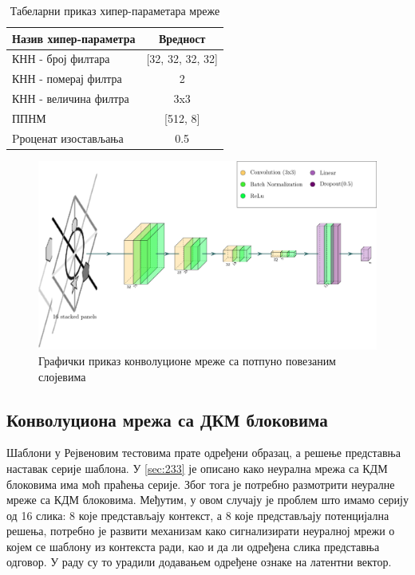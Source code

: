 \documentclass[a4paper, 12pt, master, utf8]{etf}
\begin{document}
\begin{table}[h]
    \centering
    \begin{tabular}{l | c}
    \hline
    Назив хипер-параметра & Вредност\\
    \hline
        КНН - број филтара & [32, 32, 32, 32]\\
        КНН - померај филтра & 2\\
        КНН - величина филтра & 3x3\\
        ППНМ & [512, 8]\\
        Pроценат изостављања & 0.5
    \end{tabular}
    \caption{Табеларни приказ хипер-параметара мреже}
    \label{tab:cnnmlp}
\end{table}

\begin{figure}[h]
    \centering
    \includegraphics[width=\textwidth]{arhitekture/cnn.pdf}
    \caption{Графички приказ конволуционе мреже са потпуно повезаним слојевима}
    \label{fig:cnnmlp}
\end{figure}

\subsection{Конволуциона мрежа са ДКМ блоковима}
Шаблони у Рејвеновим тестовима прате одређени образац, а решење представња наставак серије шаблона. У \ref{sec:233} је описано како неурална мрежа са КДМ блоковима има моћ праћења серије. Због тога је потребно размотрити неуралне мреже са КДМ блоковима.
Међутим, у овом случају је проблем што имамо серију од 16 слика: 8 које представљају контекст, а 8 које представљају потенцијална решења, потребно је развити механизам како сигнализирати неуралној мрежи о којем се шаблону из контекста ради, као и да ли одређена слика представња одговор.
У раду \cite{barrett_measuring_2018} су то урадили додавањем одређене ознаке на латентни вектор.
\end{document}

